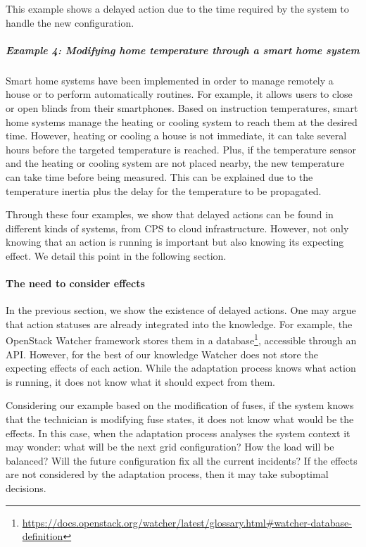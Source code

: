 This example shows a delayed action due to the time required by the system to handle the new configuration.

\subparagraph{Example 4: Modifying home temperature through a smart home system}
Smart home systems have been implemented in order to manage remotely a house or to perform automatically routines.
For example, it allows users to close or open blinds from their smartphones.
Based on instruction temperatures, smart home systems manage the heating or cooling system to reach them at the desired time.
However, heating or cooling a house is not immediate, it can take several hours before the targeted temperature is reached.
Plus, if the temperature sensor and the heating or cooling system are not placed nearby, the new temperature can take time before being measured.
This can be explained due to the temperature inertia plus the delay for the temperature to be propagated.

\bigskip

Through these four examples, we show that delayed actions can be found in different kinds of systems, from CPS to cloud infrastructure.
However, not only knowing that an action is running is important but also knowing its expecting effect.
We detail this point in the following section.

\paragraph{The need to consider effects}
In the previous section, we show the existence of delayed actions.
One may argue that action statuses are already integrated into the knowledge.
For example, the OpenStack Watcher framework stores them in a database\footnote{\url{https://docs.openstack.org/watcher/latest/glossary.html\#watcher-database-definition}}, accessible through an API.
However, for the best of our knowledge Watcher does not store the expecting effects of each action.
While the adaptation process knows what action is running, it does not know what it should expect from them.

Considering our example based on the modification of fuses, if the system knows that the technician is modifying fuse states, it does not know what would be the effects.
In this case, when the adaptation process analyses the system context it may wonder: what will be the next grid configuration? How the load will be balanced? Will the future configuration fix all the current incidents?
If the effects are not considered by the adaptation process, then it may take suboptimal decisions.

